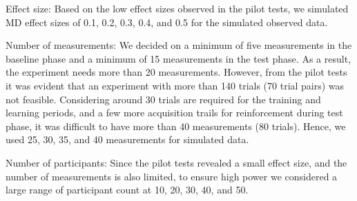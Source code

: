 \documentclass[empirical,issue, twocolumn,authordate]{jote-new-article}
\begin{document}
Effect size: Based on the low effect sizes observed in the pilot tests, we simulated MD effect sizes of 0.1, 0.2, 0.3, 0.4, and 0.5 for the simulated observed data.

Number of measurements: We decided on a minimum of five measurements in the baseline phase and a minimum of 15 measurements in the test phase. As a result, the experiment needs more than 20 measurements. However, from the pilot tests it was evident that an experiment with more than 140 trials (70 trial pairs) was not feasible. Considering around 30 trials are required for the training and learning periods, and a few more acquisition trails for reinforcement during test phase, it was difficult to have more than 40 measurements (80 trials). Hence, we used 25, 30, 35, and 40 measurements for simulated data. 

Number of participants: Since the pilot tests revealed a small effect size, and the number of measurements is also limited, to ensure high power we considered a large range of participant count at 10, 20, 30, 40, and 50. 
\end{document}
